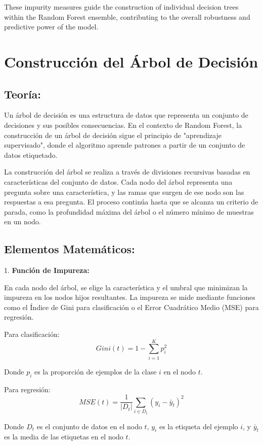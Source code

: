 \documentclass[12pt]{article}
\begin{document}
These impurity measures guide the construction of individual decision trees within the Random Forest ensemble, contributing to the overall robustness and predictive power of the model.


\section{Construcción del Árbol de Decisión}

\subsection{Teoría:}

Un árbol de decisión es una estructura de datos que representa un conjunto de decisiones y sus posibles consecuencias. En el contexto de Random Forest, la construcción de un árbol de decisión sigue el principio de "aprendizaje supervisado", donde el algoritmo aprende patrones a partir de un conjunto de datos etiquetado.

La construcción del árbol se realiza a través de divisiones recursivas basadas en características del conjunto de datos. Cada nodo del árbol representa una pregunta sobre una característica, y las ramas que surgen de ese nodo son las respuestas a esa pregunta. El proceso continúa hasta que se alcanza un criterio de parada, como la profundidad máxima del árbol o el número mínimo de muestras en un nodo.

\subsection{Elementos Matemáticos:}

1. \textbf{Función de Impureza:}

En cada nodo del árbol, se elige la característica y el umbral que minimizan la impureza en los nodos hijos resultantes. La impureza se mide mediante funciones como el Índice de Gini para clasificación o el Error Cuadrático Medio (MSE) para regresión.

Para clasificación:
\[ Gini(t) = 1 - \sum_{i=1}^{K} p_i^2 \]

Donde \( p_i \) es la proporción de ejemplos de la clase \( i \) en el nodo \( t \).

Para regresión:
\[ MSE(t) = \frac{1}{|D_t|} \sum_{i \in D_t} (y_i - \bar{y}_t)^2 \]

Donde \( D_t \) es el conjunto de datos en el nodo \( t \), \( y_i \) es la etiqueta del ejemplo \( i \), y \( \bar{y}_t \) es la media de las etiquetas en el nodo \( t \).
\end{document}

